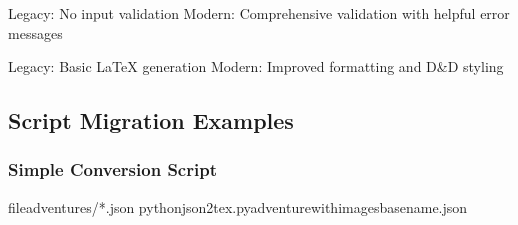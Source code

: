 \documentclass[letterpaper,10pt,english]{sphinxmanual}
\begin{document}
\sphinxAtStartPar
{}
\sphinxhyphen{} Legacy: No input validation
\sphinxhyphen{} Modern: Comprehensive validation with helpful error messages

\sphinxAtStartPar
{}
\sphinxhyphen{} Legacy: Basic LaTeX generation
\sphinxhyphen{} Modern: Improved formatting and D\&D styling


\subsection{Script Migration Examples}
\label{\detokenize{developer/legacy:script-migration-examples}}

\subsubsection{Simple Conversion Script}
\label{\detokenize{developer/legacy:simple-conversion-script}}
\sphinxAtStartPar
{}

\begin{sphinxVerbatim}[commandchars=\\\{\}]

fileadventures/*.json
pythonjson2tex.py\PYGZhy{}\PYGZhy{}adventure\PYGZhy{}\PYGZhy{}with\PYGZhy{}images\PYGZgt{}basename.json
\end{sphinxVerbatim}

\sphinxAtStartPar
{}
\end{document}
